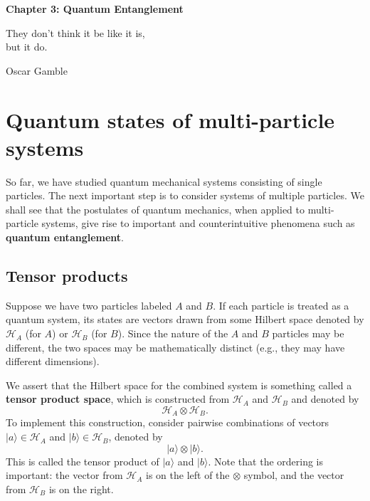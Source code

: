 \documentclass[pra,12pt]{revtex4}
\begin{document}
\setcounter{page}{38}

\begin{center}
{\Large \textbf{Chapter 3: Quantum Entanglement}}
\end{center}

\epigraph{They don't think it be like it is, \\but it do.}{Oscar Gamble}

\section{Quantum states of multi-particle systems}

So far, we have studied quantum mechanical systems consisting of
single particles.  The next important step is to consider systems of
multiple particles.  We shall see that the postulates of quantum
mechanics, when applied to multi-particle systems, give rise to
important and counterintuitive phenomena such as \textbf{quantum
  entanglement}.

\subsection{Tensor products}
\label{sec:tensorprod}

Suppose we have two particles labeled $A$ and $B$.  If each particle
is treated as a quantum system, its states are vectors drawn from some
Hilbert space denoted by $\mathscr{H}_A$ (for $A$) or $\mathscr{H}_B$
(for $B$). Since the nature of the $A$ and $B$ particles may be
different, the two spaces may be mathematically distinct (e.g., they
may have different dimensions).

We assert that the Hilbert space for the combined system
is something called a \textbf{tensor product space}, which is
constructed from $\mathscr{H}_A$ and $\mathscr{H}_B$ and denoted by
\begin{equation*}
  \mathscr{H}_A\otimes \mathscr{H}_B.
\end{equation*}
To implement this construction, consider pairwise combinations of
vectors $|a\rangle \in \mathscr{H}_A$ and $|b\rangle \in
\mathscr{H}_B$, denoted by
\begin{equation*}
  |a\rangle \otimes |b\rangle.
\end{equation*}
This is called the tensor product of $|a\rangle$ and $|b\rangle$.
Note that the ordering is important: the vector from $\mathscr{H}_A$
is on the left of the $\otimes$ symbol, and the vector from
$\mathscr{H}_B$ is on the right.
\end{document}
